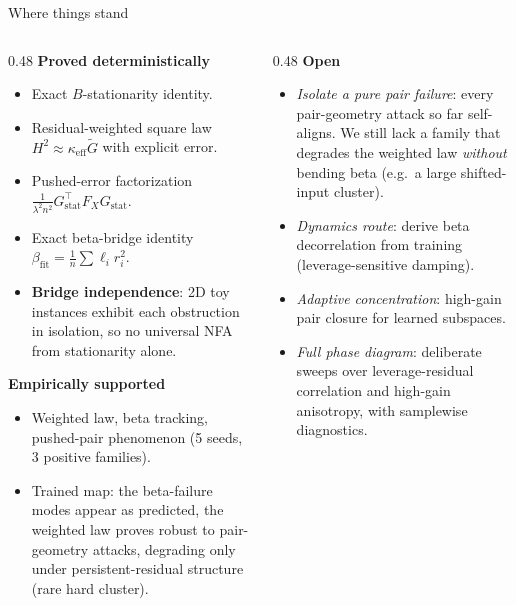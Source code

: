 \documentclass[10pt,aspectratio=169]{beamer}
\newcommand{\hl}[1]{{\color{nicered}\textbf{#1}}}
\newcommand{\T}{^{\!\top}}
\newcommand{\Gw}{\widetilde{G}}
\begin{document}
\begin{frame}{Where things stand}
  \footnotesize
  \begin{columns}[T,onlytextwidth]
    \begin{column}{0.48\textwidth}
      \textbf{Proved deterministically}
      \begin{itemize}\setlength\itemsep{1pt}
        \item Exact $B$-stationarity identity.
        \item Residual-weighted square law $H^2 \approx \kappa_{\mathrm{eff}}\Gw$ with explicit error.
        \item Pushed-error factorization $\tfrac{1}{\lambda^2 n^2}G_{\mathrm{stat}}\T F_X G_{\mathrm{stat}}$.
        \item Exact beta-bridge identity $\beta_{\mathrm{fit}} = \tfrac{1}{n}\sum \ell_i r_i^2$.
        \item \hl{Bridge independence}: 2D toy instances exhibit each obstruction in isolation, so no universal NFA from stationarity alone.
      \end{itemize}
      \vspace{6pt}
      \textbf{Empirically supported}
      \begin{itemize}\setlength\itemsep{1pt}
        \item Weighted law, beta tracking, pushed-pair phenomenon (5 seeds, 3 positive families).
        \item Trained map: the beta-failure modes appear as predicted, the weighted law proves robust to pair-geometry attacks, degrading only under persistent-residual structure (rare hard cluster).
      \end{itemize}
      \vfill\null
    \end{column}
    \begin{column}{0.48\textwidth}
      \textbf{Open}
      \begin{itemize}\setlength\itemsep{1pt}
        \item \emph{Isolate a pure pair failure}: every pair-geometry attack so far self-aligns. We still lack a family that degrades the weighted law \emph{without} bending beta (e.g.\ a large shifted-input cluster).
        \item \emph{Dynamics route}: derive beta decorrelation from training (leverage-sensitive damping).
        \item \emph{Adaptive concentration}: high-gain pair closure for learned subspaces.
        \item \emph{Full phase diagram}: deliberate sweeps over leverage-residual correlation and high-gain anisotropy, with samplewise diagnostics.

\end{itemize}
\end{column}
\end{columns}
\end{frame}
\end{document}
